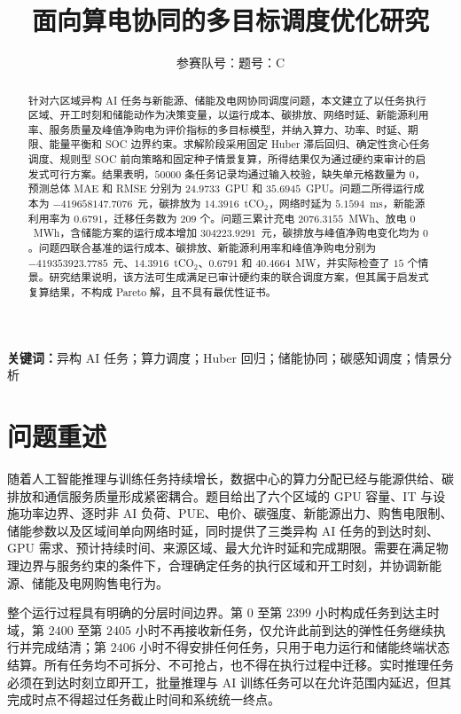 \documentclass[withoutpreface,bwprint]{cumcmthesis}
\title{面向算电协同的多目标调度优化研究}
\author{参赛队号：\quad 题号：C}
\date{}
\begin{document}
\maketitle

\begin{abstract}
针对六区域异构 AI 任务与新能源、储能及电网协同调度问题，本文建立了以任务执行区域、开工时刻和储能动作为决策变量，以运行成本、碳排放、网络时延、新能源利用率、服务质量及峰值净购电为评价指标的多目标模型，并纳入算力、功率、时延、期限、能量平衡和 SOC 边界约束。求解阶段采用固定 Huber 滞后回归、确定性贪心任务调度、规则型 SOC 前向策略和固定种子情景复算，所得结果仅为通过硬约束审计的启发式可行方案。结果表明，$50000$ 条任务记录均通过输入校验，缺失单元格数量为 $0$，预测总体 MAE 和 RMSE 分别为 $24.9733$~GPU 和 $35.6945$~GPU。问题二所得运行成本为 $-419658147.7076$~元，碳排放为 $14.3916$~tCO$_2$，网络时延为 $5.1594$~ms，新能源利用率为 $0.6791$，迁移任务数为 $209$ 个。问题三累计充电 $2076.3155$~MWh、放电 $0$~MWh，含储能方案的运行成本增加 $304223.9291$~元，碳排放与峰值净购电变化均为 $0$。问题四联合基准的运行成本、碳排放、新能源利用率和峰值净购电分别为 $-419353923.7785$~元、$14.3916$~tCO$_2$、$0.6791$ 和 $40.4664$~MW，并实际检查了 $15$ 个情景。研究结果说明，该方法可生成满足已审计硬约束的联合调度方案，但其属于启发式复算结果，不构成 Pareto 解，且不具有最优性证书。
\end{abstract}

\noindent\textbf{关键词：}异构 AI 任务；算力调度；Huber 回归；储能协同；碳感知调度；情景分析

\clearpage

\section{问题重述}

随着人工智能推理与训练任务持续增长，数据中心的算力分配已经与能源供给、碳排放和通信服务质量形成紧密耦合。题目给出了六个区域的 GPU 容量、IT 与设施功率边界、逐时非 AI 负荷、PUE、电价、碳强度、新能源出力、购售电限制、储能参数以及区域间单向网络时延，同时提供了三类异构 AI 任务的到达时刻、GPU 需求、预计持续时间、来源区域、最大允许时延和完成期限。需要在满足物理边界与服务约束的条件下，合理确定任务的执行区域和开工时刻，并协调新能源、储能及电网购售电行为。

整个运行过程具有明确的分层时间边界。第 $0$ 至第 $2399$ 小时构成任务到达主时域，第 $2400$ 至第 $2405$ 小时不再接收新任务，仅允许此前到达的弹性任务继续执行并完成结清；第 $2406$ 小时不得安排任何任务，只用于电力运行和储能终端状态结算。所有任务均不可拆分、不可抢占，也不得在执行过程中迁移。实时推理任务必须在到达时刻立即开工，批量推理与 AI 训练任务可以在允许范围内延迟，但其完成时点不得超过任务截止时间和系统统一终点。
\end{document}
